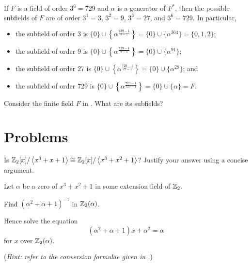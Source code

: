 \begin{example}
    If $F$ is a field of order $3^6 = 729$ and $\alpha$ is a generator of $F^\ast$, then the possible subfields of $F$ are of order $3^1 = 3$, $3^2 = 9$, $3^3 = 27$, and $3^6 = 729$. In particular,
    \begin{itemize}
        \item the subfield of order 3 is $\{0\} \cup \left\{\alpha^{\frac{729-1}{3-1}}\right\} = \{0\} \cup \{\alpha^{364}\} = \{0,1,2\}$;
        \item the subfield of order 9 is $\{0\} \cup \left\{\alpha^{\frac{729-1}{9-1}}\right\} = \{0\} \cup \{\alpha^{91}\}$;
        \item the subfield of order 27 is $\{0\} \cup \left\{\alpha^{\frac{729-1}{27-1}}\right\} = \{0\} \cup \{\alpha^{28}\}$; and
        \item the subfield of order 729 is $\{0\} \cup \left\{\alpha^{\frac{729-1}{729-1}}\right\} = \{0\} \cup \{\alpha\} = F$.
    \end{itemize}
\end{example}

\begin{exercise}
    Consider the finite field $F$ in . What are its subfields?
\end{exercise}

\newpage

\section{Problems}
\begin{problem}
    Is $\mathbb{Z}_2[x]/\left\langle x^3+x+1\right\rangle \cong \mathbb{Z}_2[x]/\left\langle x^3+x^2+1\right\rangle$? Justify your answer using a concise argument.
\end{problem}

\begin{problem}
    Let $\alpha$ be a zero of $x^3 + x^2 + 1$ in some extension field of $\mathbb{Z}_2$.
    \begin{partquestions}{\roman*}
        \item Find $(\alpha^2 + \alpha + 1)^{-1}$ in $\mathbb{Z}_2(\alpha)$.
        \item Hence solve the equation
        \[
            (\alpha^2 + \alpha + 1)x + \alpha^2 = \alpha
        \]
        for $x$ over $\mathbb{Z}_2(\alpha)$.
    \end{partquestions}
    (\textit{Hint: refer to the conversion formulae given in .})
\end{problem}

